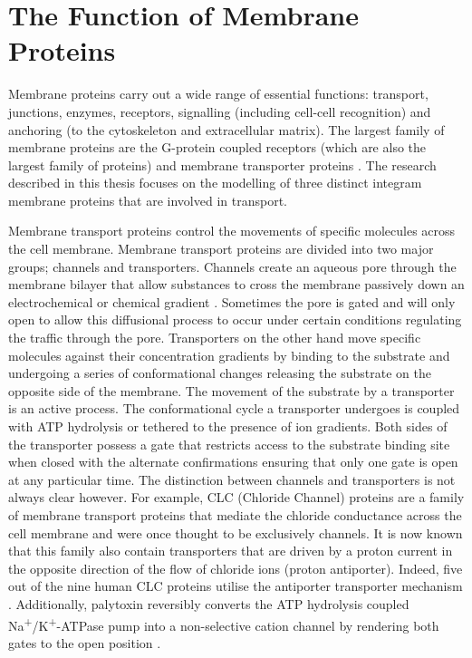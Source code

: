 \section{The Function of Membrane Proteins}
Membrane proteins carry out a wide range of essential functions: transport, junctions, enzymes, receptors, signalling (including cell-cell recognition) and anchoring (to the cytoskeleton and extracellular matrix).  The largest family of membrane proteins are the G-protein coupled receptors (which are also the largest family of proteins) and membrane transporter proteins \cite{lesk2021protein}.  The research described in this thesis focuses on the modelling of three distinct integram membrane proteins that are involved in transport. 

Membrane transport proteins control the movements of specific molecules across the cell membrane. Membrane transport proteins are divided into two major groups; channels and transporters.  Channels create an aqueous pore through the membrane bilayer that allow substances to cross the membrane passively down an electrochemical or chemical gradient \cite{alberts2002principles}.  Sometimes the pore is gated and will only open to allow this diffusional process to occur under certain conditions regulating the traffic through the pore.  Transporters on the other hand move specific molecules against their concentration gradients by binding to the substrate and undergoing a series of conformational changes releasing the substrate on the opposite side of the membrane.  The movement of the substrate by a transporter is an active process.  The conformational cycle a transporter undergoes is coupled with ATP hydrolysis or tethered to the presence of ion gradients.  Both sides of the transporter possess a gate that restricts access to the substrate binding site when closed with the alternate confirmations ensuring that only one gate is open at any particular time.  The distinction between channels and transporters is not always clear \cite{ashcroft2009introduction} however.  For example, CLC (Chloride Channel) proteins are a family of membrane transport proteins that mediate the chloride conductance across the cell membrane and were once thought to be exclusively channels.  It is now known that this family also contain transporters that are driven by a proton current in the opposite direction of the flow of chloride ions (proton antiporter).  Indeed, five out of the nine human CLC proteins utilise the antiporter transporter mechanism \cite{miller2009provisional}.  Additionally, palytoxin reversibly converts the ATP hydrolysis coupled Na\textsuperscript{+}/K\textsuperscript{+}-ATPase pump into a non-selective cation channel by rendering both gates to the open position \cite{gadsby2009peering}. 

